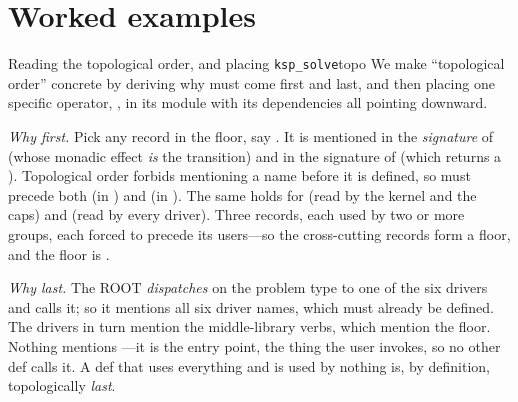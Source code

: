 \section{Worked examples}

\begin{workedexample}{Reading the topological order, and placing \texttt{ksp\_solve}}{topo}
We make ``topological order'' concrete by deriving why  must come first
and  last, and then placing one specific operator,
, in its module with its dependencies all pointing downward.

\emph{Why  first.} Pick any record in the floor, say .
It is mentioned in the \emph{signature} of  (whose monadic effect
\emph{is} the  transition) and in the signature of 
(which returns a ). Topological order forbids mentioning a name before
it is defined, so  must precede both  (in
) and  (in ). The same holds for
 (read by the kernel and the caps) and  (read by every
driver). Three records, each used by two or more groups, each forced to precede its
users---so the cross-cutting records form a floor, and the floor is .

\emph{Why  last.} The  ROOT \emph{dispatches} on the
problem type to one of the six drivers and calls it; so it mentions all six driver
names, which must already be defined. The drivers in turn mention the middle-library
verbs, which mention the floor. Nothing mentions ---it is the entry
point, the thing the user invokes, so no other def calls it. A def that uses
everything and is used by nothing is, by definition, topologically \emph{last}.


\end{workedexample}
